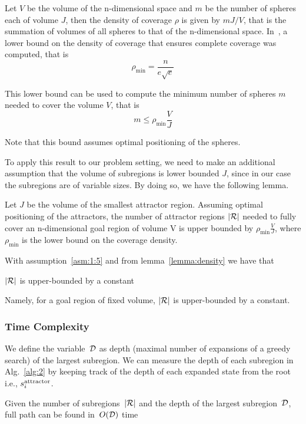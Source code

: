 \documentclass[a4paper]{report}
\begin{document}
Let $V$ be the volume of the n-dimensional space and $m$ be the number of spheres each of volume $J$, then the density of coverage $\rho$ is given by $mJ/V$, that is the summation of volumes of all spheres to that of the n-dimensional space.
In~\cite{cover_spheres2}, a lower bound on the density of coverage that ensures complete coverage was computed, that is 
$$
\rho_{\textrm{min}} = \frac{n}{e\sqrt{e}}
$$

This lower bound can be used to compute the minimum number of spheres $m$ needed to cover the volume $V$, that is
$$
m \leq \rho_{\textrm{min}}\frac{V}{J}
$$

Note that this bound assumes optimal positioning of the spheres.

To apply this result to our problem setting, we need to make an additional assumption that the volume of subregions is lower bounded $J$, since in our case the subregions are of variable sizes. By doing so, we have the following lemma.

\vspace{2mm}
\begin{lemma}
\label{lemma:density}
Let $J$ be the volume of the smallest attractor region. Assuming optimal positioning of the attractors, the number of attractor regions $|\mathcal{R}|$ needed to fully cover an n-dimensional goal region of volume V is upper bounded by $\rho_{\textrm{min}} \frac{V}{J}$, where $\rho_{\textrm{min}}$ is the lower bound on the coverage density.
\end{lemma}

With assumption~\ref{asm:1:5} and from lemma~\ref{lemma:density} we have that

\vspace{2mm}
\begin{lemma}
\label{lemma:upper_bound}
$|\mathcal{R}|$ is upper-bounded by a constant
\end{lemma} 

Namely, for a goal region of fixed volume, $|\mathcal{R}|$ is upper-bounded by a constant.

\label{subsec:complexity}
\subsubsection{Time Complexity}
We define the variable~$\mathcal{D}$ as depth (maximal number of expansions of a greedy search) of the largest subregion. We can measure the depth of each subregion in Alg.~\ref{alg:2} by keeping track of the depth of each expanded state from the root i.e., $s^{\text{attractor}}_i$.
%
\vspace{2mm}
\begin{lemma}
\label{lemma:unboundedD}
Given the number of subregions~$|\mathcal{R}|$ and the depth of the largest subregion~$\mathcal{D}$, full path can be found in~$O(\mathcal{D})$ time
\end{lemma}
\end{document}
